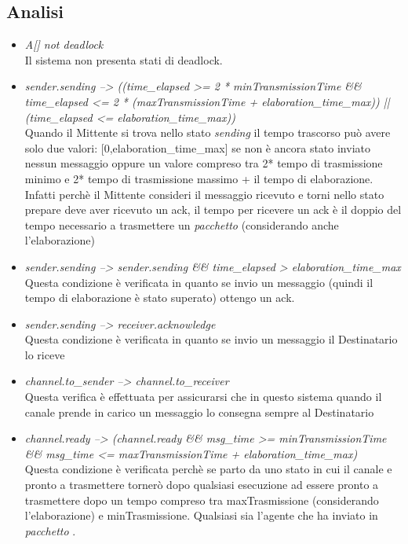 \documentclass[a4paper]{article}
\newcommand{\pacchetto}{\textit{pacchetto }}
\begin{document}
\subsection{Analisi}
\begin{itemize}
	\item \textit{A[] not deadlock}\\
		Il sistema non presenta stati di deadlock.
	\item \textit{sender.sending --> ((time\_elapsed >= 2 * minTransmissionTime \&\& time\_elapsed <= 2 * (maxTransmissionTime + elaboration\_time\_max)) ||(time\_elapsed <= elaboration\_time\_max))}\\
		Quando il Mittente si trova nello stato \textit{sending} il tempo trascorso può avere solo due valori: [0,elaboration\_time\_max] se non è ancora stato inviato nessun messaggio oppure un valore compreso tra 2* tempo di trasmissione minimo e 2* tempo di trasmissione massimo + il tempo di elaborazione. Infatti perchè il Mittente consideri il messaggio ricevuto e torni nello stato prepare deve aver ricevuto un ack, il tempo per ricevere un ack è il doppio del tempo necessario a trasmettere un \pacchetto (considerando anche l'elaborazione)
	\item \textit{sender.sending --> sender.sending \&\& time\_elapsed > elaboration\_time\_max}\\
		Questa condizione è verificata in quanto se invio un messaggio (quindi il tempo di elaborazione è stato superato) ottengo un ack. 
	\item \textit{sender.sending --> receiver.acknowledge}\\
		Questa condizione è verificata in quanto se invio un messaggio il Destinatario lo riceve
	\item \textit{channel.to\_sender --> channel.to\_receiver}\\
		Questa verifica è effettuata per assicurarsi che in questo sistema quando il canale prende in carico un messaggio lo consegna sempre al Destinatario
	\item \textit{channel.ready --> (channel.ready \&\& msg\_time >= minTransmissionTime \&\& msg\_time <= maxTransmissionTime + elaboration\_time\_max)}\\
		Questa condizione è verificata perchè se parto da uno stato in cui il canale e pronto a trasmettere tornerò dopo qualsiasi esecuzione ad essere pronto a trasmettere dopo un tempo compreso tra maxTrasmissione (considerando l'elaborazione) e minTrasmissione.
		Qualsiasi sia l'agente che ha inviato in \pacchetto.
\end{itemize}
\end{document}
